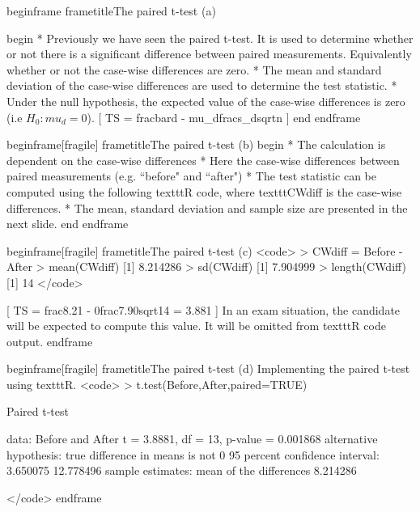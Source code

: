 begin{frame}
frametitle{The paired t-test (a)}

begin{ }
         * Previously we have seen the paired t-test. It is used to determine whether or
not there is a significant difference between paired measurements. Equivalently whether or not
the case-wise differences are zero.
         * The mean and standard deviation of the case-wise differences are used to determine the test statistic.
         * Under the null hypothesis, the expected value of the case-wise differences is zero (i.e $H_0 : mu_d = 0$).
[ TS = frac{bar{d} - mu_d}{frac{s_d}{sqrt{n}}} ]
end{ }
end{frame}


begin{frame}[fragile]
frametitle{The paired t-test (b)}
begin{ }
         * The calculation is dependent on the case-wise differences
         * Here the case-wise differences between paired measurements (e.g. ``before" and ``after")
         * The test statistic can be computed using the following texttt{R} code, where texttt{CWdiff} is the case-wise differences.          * The mean, standard deviation and sample size are presented in the next slide.
end{ }
end{frame}

begin{frame}[fragile]
frametitle{The paired t-test (c)}
<code>
> CWdiff = Before - After
> mean(CWdiff)
[1] 8.214286
> sd(CWdiff)
[1] 7.904999
> length(CWdiff)
[1] 14
</code>

[ TS = frac{8.21 - 0}{frac{7.90}{sqrt{14}}} = 3.881 ]
In an exam situation, the candidate will be expected to compute this value. It will be omitted from texttt{R} code output.
end{frame}

begin{frame}[fragile]
frametitle{The paired t-test (d)}
Implementing the paired t-test using texttt{R}.
<code>
> t.test(Before,After,paired=TRUE)

        Paired t-test

data:  Before and After
t = 3.8881, df = 13, p-value = 0.001868
alternative hypothesis: true difference in means is not 0
95 percent confidence interval:
  3.650075 12.778496
sample estimates:
mean of the differences
               8.214286

</code>
end{frame}

